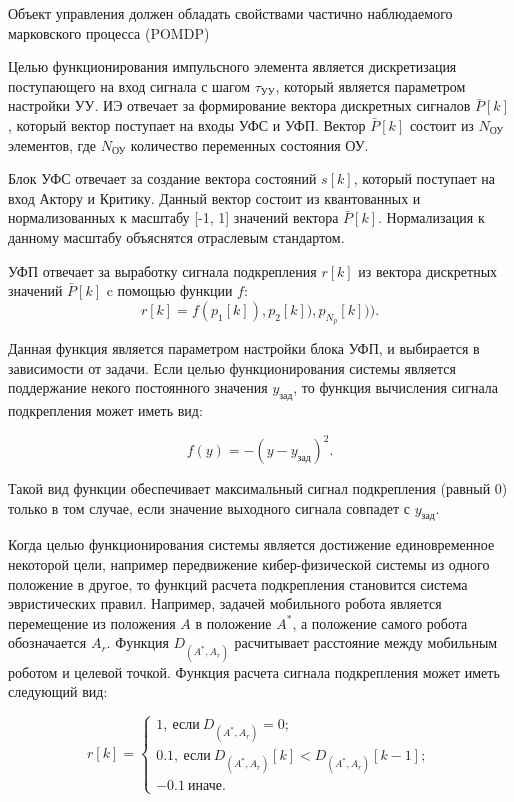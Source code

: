 Объект управления должен обладать свойствами частично наблюдаемого марковского процесса (POMDP)

Целью функционирования импульсного элемента является дискретизация поступающего на вход сигнала с шагом $\tau_{\text{УУ}}$, который является параметром настройки УУ. ИЭ отвечает за формирование вектора дискретных сигналов $\bar{P}[k]$, который вектор поступает на входы УФС и УФП. Вектор $\bar{P}[k]$ состоит из $N_{\text{ОУ}}$ элементов, где $N_{\text{ОУ}}$ количество переменных состояния ОУ.

Блок УФС отвечает за создание вектора состояний $s[k]$, который поступает на вход Актору и Критику. Данный вектор состоит из квантованных и нормализованных к масштабу [-1, 1] значений вектора $\bar{P}[k]$. Нормализация к данному масштабу объяснятся отраслевым стандартом.


УФП отвечает за выработку сигнала подкрепления $ r[k] $ из вектора дискретных значений $ \bar{P}[k] $ c помощью функции $ f $:
$$
r[k] = f(p_1[k]), p_2[k]), p_{N_p}[k])).
$$

Данная функция является параметром настройки блока УФП, и выбирается в зависимости от задачи. Если целью функционирования системы является поддержание некого постоянного значения $ y_{\text{зад}} $, то функция вычисления сигнала подкрепления может иметь вид:

$$
f(y) = -(y-y_{\text{зад}})^2.
$$

\noindent Такой вид функции обеспечивает максимальный сигнал подкрепления (равный 0) только в том случае, если значение выходного сигнала совпадет с  $ y_{\text{зад}} $.

Когда целью функционирования системы является достижение единовременное некоторой цели, например передвижение кибер-физической системы из одного положение в другое, то функций расчета подкрепления становится система эвристических правил. Например, задачей мобильного робота является перемещение из положения $ A $ в положение $ A^* $, а положение самого робота обозначается $ A_r $. Функция $ D_{(A^*, A_r)} $ расчитывает расстояние между мобильным роботом и целевой точкой. Функция расчета сигнала подкрепления может иметь следующий вид:

$$
r[k] = 
\begin{cases}
1, \: \text{если} \: D_{(A^*, A_r)}=0; \\
0.1, \: \text{если} \: D_{(A^*, A_r)}[k] < D_{(A^*, A_r)}[k-1]; \\
-0.1 \: \text{иначе}.
\end{cases}
$$

